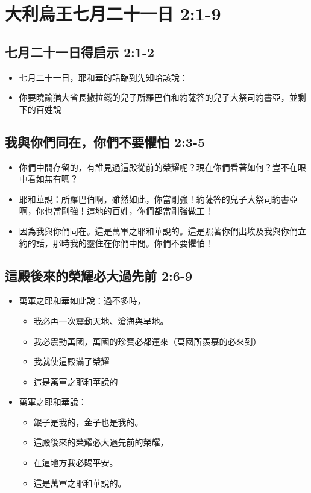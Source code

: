 \section{大利烏王七月二十一日 2:1-9}
\subsection{七月二十一日得启示 2:1-2}
\begin{itemize} 
\itemsep-.35em 
\item 七月二十一日，耶和華的話臨到先知哈該說：
\item 你要曉諭猶大省長撒拉鐵的兒子所羅巴伯和約薩答的兒子大祭司約書亞，並剩下的百姓說
\end{itemize}

\subsection{我與你們同在，你們不要懼怕 2:3-5}
\begin{itemize} 
\itemsep-.35em 
\item 你們中間存留的，有誰見過這殿從前的榮耀呢？現在你們看著如何？豈不在眼中看如無有嗎？
\item 耶和華說：所羅巴伯啊，雖然如此，你當剛強！約薩答的兒子大祭司約書亞啊，你也當剛強！這地的百姓，你們都當剛強做工！
\item 因為我與你們同在。這是萬軍之耶和華說的。這是照著你們出埃及我與你們立約的話，那時我的靈住在你們中間。你們不要懼怕！
\end{itemize}

\subsection{這殿後來的榮耀必大過先前 2:6-9}  
\begin{itemize} 
\itemsep-.35em 
\item 萬軍之耶和華如此說：過不多時，
\begin{itemize} 
\itemsep-.35em 
\item 我必再一次震動天地、滄海與旱地。
\item 我必震動萬國，萬國的珍寶必都運來（萬國所羨慕的必來到）
\item 我就使這殿滿了榮耀
\item 這是萬軍之耶和華說的 
\end{itemize}
\item 萬軍之耶和華說：
\begin{itemize} 
\itemsep-.35em 
\item 銀子是我的，金子也是我的。
\item 這殿後來的榮耀必大過先前的榮耀，
\item 在這地方我必賜平安。
\item 這是萬軍之耶和華說的。
\end{itemize}
\end{itemize}


